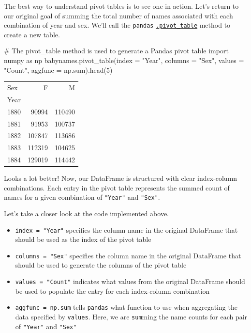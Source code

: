 \documentclass[
  letterpaper,
  DIV=11,
  numbers=noendperiod]{scrreprt}
\newenvironment{Shaded}{\begin{snugshade}}{\end{snugshade}}
\newcommand{\BuiltInTok}[1]{\textcolor[rgb]{0.00,0.23,0.31}{#1}}
\newcommand{\CommentTok}[1]{\textcolor[rgb]{0.37,0.37,0.37}{#1}}
\newcommand{\DecValTok}[1]{\textcolor[rgb]{0.68,0.00,0.00}{#1}}
\newcommand{\ImportTok}[1]{\textcolor[rgb]{0.00,0.46,0.62}{#1}}
\newcommand{\NormalTok}[1]{\textcolor[rgb]{0.00,0.23,0.31}{#1}}
\newcommand{\OperatorTok}[1]{\textcolor[rgb]{0.37,0.37,0.37}{#1}}
\newcommand{\StringTok}[1]{\textcolor[rgb]{0.13,0.47,0.30}{#1}}
\providecommand{\tightlist}{%
  \setlength{\itemsep}{0pt}\setlength{\parskip}{0pt}}\usepackage{longtable,booktabs,array}
\begin{document}
The best way to understand pivot tables is to see one in action. Let's
return to our original goal of summing the total number of names
associated with each combination of year and sex. We'll call the
\texttt{pandas}
\href{https://pandas.pydata.org/pandas-docs/stable/reference/api/pandas.pivot_table.html}{\texttt{.pivot\_table}}
method to create a new table.

\begin{Shaded}
\begin{Highlighting}[]
\CommentTok{\# The \textasciigrave{}pivot\_table\textasciigrave{} method is used to generate a Pandas pivot table}
\ImportTok{import}\NormalTok{ numpy }\ImportTok{as}\NormalTok{ np}
\NormalTok{babynames.pivot\_table(index }\OperatorTok{=} \StringTok{"Year"}\NormalTok{, columns }\OperatorTok{=} \StringTok{"Sex"}\NormalTok{, values }\OperatorTok{=} \StringTok{"Count"}\NormalTok{, aggfunc }\OperatorTok{=}\NormalTok{ np.}\BuiltInTok{sum}\NormalTok{).head(}\DecValTok{5}\NormalTok{)}
\end{Highlighting}
\end{Shaded}

\begin{tabular}{lrr}
\toprule
Sex &       F &       M \\
Year &         &         \\
\midrule
1880 &   90994 &  110490 \\
1881 &   91953 &  100737 \\
1882 &  107847 &  113686 \\
1883 &  112319 &  104625 \\
1884 &  129019 &  114442 \\
\bottomrule
\end{tabular}

Looks a lot better! Now, our DataFrame is structured with clear
index-column combinations. Each entry in the pivot table represents the
summed count of names for a given combination of \texttt{"Year"} and
\texttt{"Sex"}.

Let's take a closer look at the code implemented above.

\begin{itemize}
\tightlist
\item
  \texttt{index\ =\ "Year"} specifies the column name in the original
  DataFrame that should be used as the index of the pivot table
\item
  \texttt{columns\ =\ "Sex"} specifies the column name in the original
  DataFrame that should be used to generate the columns of the pivot
  table
\item
  \texttt{values\ =\ "Count"} indicates what values from the original
  DataFrame should be used to populate the entry for each index-column
  combination
\item
  \texttt{aggfunc\ =\ np.sum} tells \texttt{pandas} what function to use
  when aggregating the data specified by \texttt{values}. Here, we are
  \texttt{sum}ming the name counts for each pair of \texttt{"Year"} and
  \texttt{"Sex"}
\end{itemize}
\end{document}
